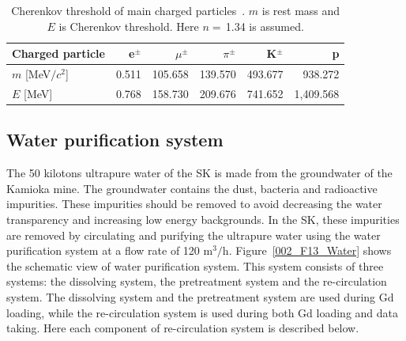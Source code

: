 \begin{table}[tbp]
	\caption[Cherenkov threshold of main charged particles]{\label{002_Tab:Che} Cherenkov threshold of main charged particles~\cite{2022Workman}. $m$ is rest mass and $E$ is Cherenkov threshold. Here $n=\,$1.34 is assumed.}
	\centering
	\vs
	\begin{tabular}{lrrrrr}
		\hline\hline
		Charged particle&e$^{\pm}$&$\mu^{\pm}$&$\pi^{\pm}$&K$^{\pm}$&p\\
		\hline
		$m$ [MeV$/c^{\text{2}}$]&0.511&105.658&139.570&493.677&938.272\\
		$E$ [MeV]&0.768&158.730&209.676&741.652&1,409.568\\
		\hline\hline
	\end{tabular}
\end{table}

\subsection{Water purification system}
\vs\hs The 50 kilotons ultrapure water of the SK is made from the groundwater of the Kamioka mine.
The groundwater contains the dust, bacteria and radioactive impurities.
These impurities should be removed to avoid decreasing the water transparency and increasing low energy backgrounds.
In the SK, these impurities are removed by circulating and purifying the ultrapure water using the water purification system at a flow rate of 120 m$^{\text{3}}/$h.
Figure~\ref{002_F13_Water} shows the schematic view of water purification system.
This system consists of three systems: the dissolving system, the pretreatment system and the re-circulation system.
The dissolving system and the pretreatment system are used during Gd loading, while the re-circulation system is used during both Gd loading and data taking.
Here each component of re-circulation system is described below.
